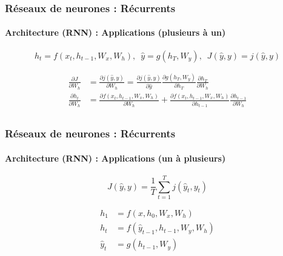 \documentclass[xcolor=table]{beamer}
\begin{document}
\begin{frame}
	\frametitle{Réseaux de neurones : Récurrents}
	\framesubtitle{Architecture (RNN) : Applications (plusieurs à un)}
	
	\vspace*{-0.5cm}
	\[ h_t = f(x_t, h_{t-1}, W_x, W_h),\,\,\, \hat{y} = g(h_T, W_y),\,\,\,  J(\hat{y}, y) = j(\hat{y}, y)\]
	
	\begin{minipage}{0.6\textwidth}\scriptsize
		\begin{align*}
			\frac{\partial J}{\partial W_h} &= \frac{\partial j(\hat{y}, y)}{\partial W_h}
			= \frac{\partial j(\hat{y}, y)}{\partial \hat{y}} 
			\frac{\partial g(h_T, W_y)}{\partial h_T} 
			\frac{\partial h_T}{\partial W_h} \\
			\frac{\partial h_t}{\partial W_h} &= 
			\frac{\partial f(x_t, h_{t-1}, W_x, W_h)}{\partial W_h} + 
			\frac{\partial f(x_t, h_{t-1}, W_x, W_h)}{\partial h_{t-1}} \frac{\partial h_{t-1}}{\partial W_h}\\
		\end{align*}
	\end{minipage}
	\begin{minipage}{0.38\textwidth}
	\end{minipage}

\end{frame}

\begin{frame}
	\frametitle{Réseaux de neurones : Récurrents}
	\framesubtitle{Architecture (RNN) : Applications (un à plusieurs)}
	
	\vspace*{-0.5cm}
	\[ J(\hat{y}, y) = \frac{1}{T} \sum_{t=1}^{T} j(\hat{y}_{t}, y_t)\]
	
	\begin{minipage}{0.6\textwidth}
		\begin{align*}
			h_1 & = f(x, h_{0}, W_x, W_h) \\
			h_{t} & = f(\hat{y}_{t-1}, h_{t-1}, W_y, W_h) \\
			\hat{y}_{t} & = g(h_{t-1}, W_y) \\
		\end{align*}
	\end{minipage}
	\begin{minipage}{0.38\textwidth}
	\end{minipage}

\end{frame}
\end{document}
